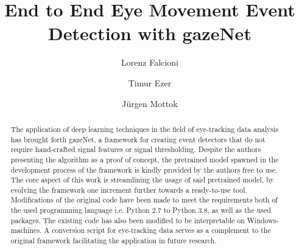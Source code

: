 \documentclass[acmlarge]{acmart}
\begin{document}
\title{End to End Eye Movement Event Detection with gazeNet}

\author{Lorenz Falcioni}

\author{Timur Ezer}

\author{Jürgen Mottok}


\begin{abstract}
    The application of deep learning techniques in the field of eye-tracking data analysis has brought forth gazeNet, a framework for creating event detectors that do not require hand-crafted signal features or signal thresholding. Despite the authors presenting the algorithm as a proof of concept, the pretrained model spawned in the development process of the  framework is kindly provided by the authors free to use. The core aspect of this work is streamlining the usage of said pretrained model, by evolving the framework one increment further towards a ready-to-use tool. Modifications of the original code have been made to meet the requirements both of the used programming language i.e. Python 2.7 to Python 3.8, as well as the used packages. The existing code has also been modified to be interpretable on Windows-machines. A conversion script for eye-tracking data serves as a complement to the original framework facilitating the application in future research.
\end{abstract}

\maketitle


\end{document}
